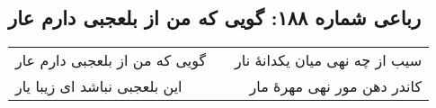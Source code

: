 \begin{center}
\section*{رباعی شماره ۱۸۸: گویی که من از بلعجبی دارم عار}
\label{sec:sh188}
\begin{longtable}{l p{0.5cm} r}
گویی که من از بلعجبی دارم عار
&&
سیب از چه نهی میان یکدانهٔ نار
\\
این بلعجبی نباشد ای زیبا یار
&&
کاندر دهن مور نهی مهرهٔ مار
\\
\end{longtable}
\end{center}
